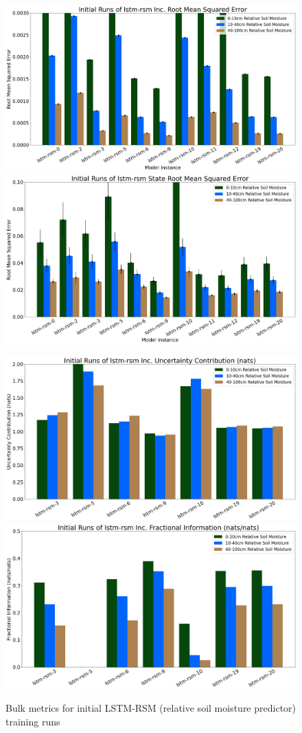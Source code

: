 \begin{figure}[hp!]
    \includegraphics[width=.48\linewidth,draft=false]{figures/efficiency_initial-best/eval_test_efficiency_initial-lstm-rsm_mse_res.png}
    \includegraphics[width=.48\linewidth,draft=false]{figures/efficiency_initial-best/eval_test_efficiency_initial-lstm-rsm_mse_state.png}

    \includegraphics[width=.48\linewidth,draft=false]{figures/efficiency_initial-best/eval_test_efficiency_initial-lstm-rsm_info-loss_res.png}
    \includegraphics[width=.48\linewidth,draft=false]{figures/efficiency_initial-best/eval_test_efficiency_initial-lstm-rsm_fi_res.png}

    \caption{Bulk metrics for initial LSTM-RSM (relative soil moisture predictor) training runs}
    \label{model-init-lstm-rsm}
\end{figure}

